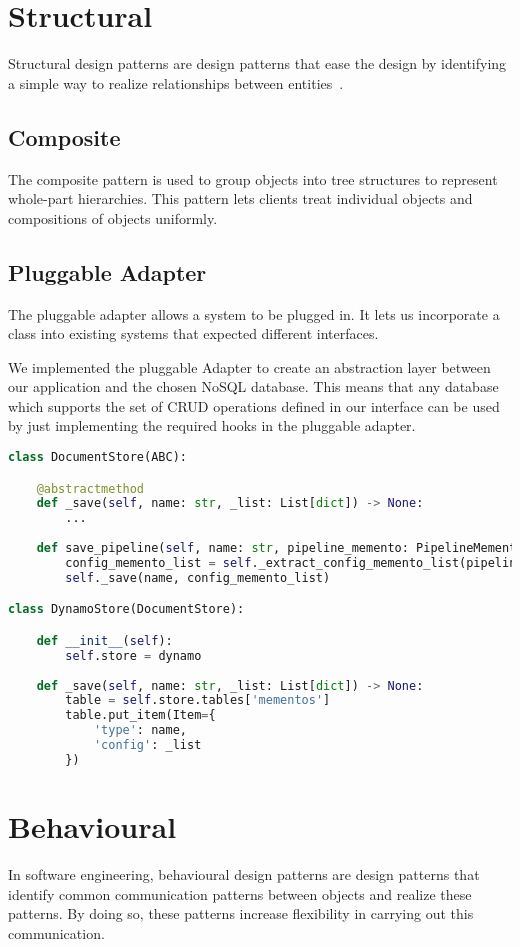 \section{Structural}
Structural design patterns are design patterns that ease the design by identifying a simple way to
realize relationships between entities~\citep{OODesign}.


\subsection{Composite}
The composite pattern is used to group objects into tree structures to represent whole-part hierarchies. This pattern lets clients treat individual objects and compositions of objects uniformly. \cite{sourcemaking}

\subsection{Pluggable Adapter}
The pluggable adapter allows a system to be plugged in. It lets us incorporate a class into
existing systems that expected different interfaces.

We implemented the pluggable Adapter to create an abstraction layer between our application and
the chosen NoSQL database. This means that any database which supports the set of CRUD operations
defined in our interface can be used by just implementing the required hooks in the pluggable
adapter.

\begin{lstlisting}[language=Python]
class DocumentStore(ABC):

	@abstractmethod
	def _save(self, name: str, _list: List[dict]) -> None:
		...
	
	def save_pipeline(self, name: str, pipeline_memento: PipelineMemento) -> None:
		config_memento_list = self._extract_config_memento_list(pipeline_memento)
		self._save(name, config_memento_list)

class DynamoStore(DocumentStore):

	def __init__(self):
		self.store = dynamo
	
	def _save(self, name: str, _list: List[dict]) -> None:
		table = self.store.tables['mementos']
		table.put_item(Item={
			'type': name,
			'config': _list
		})
\end{lstlisting}

\section{Behavioural}
In software engineering, behavioural design patterns are design patterns that identify common communication patterns between objects and realize these patterns. By doing so, these patterns increase flexibility in carrying out this communication. \cite{sourcemaking}

